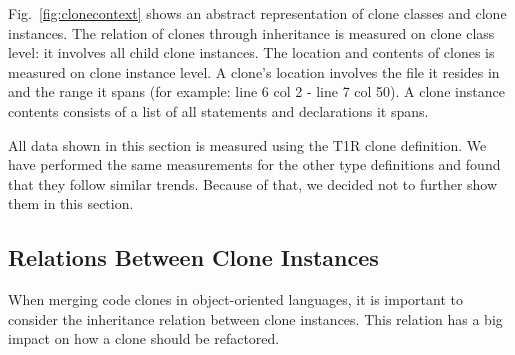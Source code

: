 \documentclass[a4paper]{article}
\begin{document}
Fig.~\ref{fig:clonecontext} shows an abstract representation of clone classes and clone instances. The relation of clones through inheritance is measured on clone class level: it involves all child clone instances. The location and contents of clones is measured on clone instance level. A clone's location involves the file it resides in and the range it spans (for example: line 6 col 2 - line 7 col 50). A clone instance contents consists of a list of all statements and declarations it spans.

All data shown in this section is measured using the T1R clone definition. We have performed the same measurements for the other type definitions and found that they follow similar trends. Because of that, we decided not to further show them in this section.

\subsection{Relations Between Clone Instances} \label{chap:relationsinstances}
When merging code clones in object-oriented languages, it is important to consider the inheritance relation between clone instances. This relation has a big impact on how a clone should be refactored.
\end{document}
